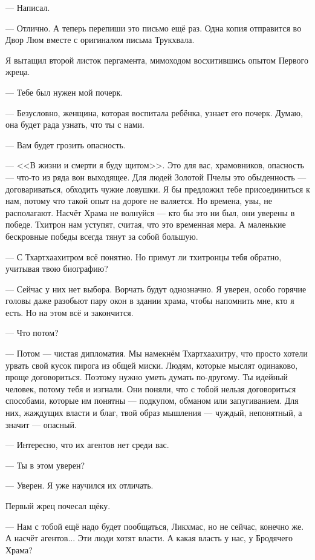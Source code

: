 --- Написал.

--- Отлично.
А теперь перепиши это письмо ещё раз.
Одна копия отправится во Двор Люм вместе с оригиналом письма Трукхвала.

Я вытащил второй листок пергамента, мимоходом восхитившись опытом Первого жреца.

--- Тебе был нужен мой почерк.

--- Безусловно, женщина, которая воспитала ребёнка, узнает его почерк.
Думаю, она будет рада узнать, что ты с нами.

--- Вам будет грозить опасность.

--- <<В жизни и смерти я буду щитом>>.
Это для вас, храмовников, опасность --- что-то из ряда вон выходящее.
Для людей Золотой Пчелы это обыденность --- договариваться, обходить чужие ловушки.
Я бы предложил тебе присоединиться к нам, потому что такой опыт на дороге не валяется.
Но времена, увы, не располагают.
Насчёт Храма не волнуйся --- кто бы это ни был, они уверены в победе.
Тхитрон нам уступят, считая, что это временная мера.
А маленькие бескровные победы всегда тянут за собой большую.

--- С Тхартхаахитром всё понятно.
Но примут ли тхитронцы тебя обратно, учитывая твою биографию?

--- Сейчас у них нет выбора.
Ворчать будут однозначно.
Я уверен, особо горячие головы даже разобьют пару окон в здании храма, чтобы напомнить мне, кто я есть.
Но на этом всё и закончится.

--- Что потом?

--- Потом --- чистая дипломатия.
Мы намекнём Тхартхаахитру, что просто хотели урвать свой кусок пирога из общей миски.
Людям, которые мыслят одинаково, проще договориться.
Поэтому нужно уметь думать по-другому.
Ты идейный человек, потому тебя и изгнали.
Они поняли, что с тобой нельзя договориться способами, которые им понятны --- подкупом, обманом или запугиванием.
Для них, жаждущих власти и благ, твой образ мышления --- чуждый, непонятный, а значит --- опасный.

--- Интересно, что их агентов нет среди вас.

--- Ты в этом уверен?

--- Уверен.
Я уже научился их отличать.

Первый жрец почесал щёку.

--- Нам с тобой ещё надо будет пообщаться, Ликхмас, но не сейчас, конечно же.
А насчёт агентов...
Эти люди хотят власти.
А какая власть у нас, у Бродячего Храма?

